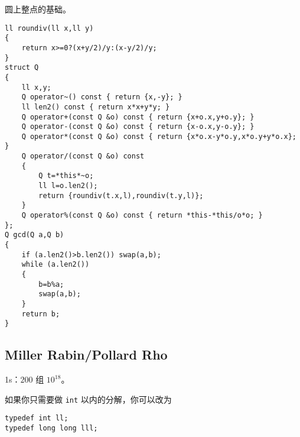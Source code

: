 \documentclass[12pt]{ctexart}
\begin{document}
圆上整点的基础。

\begin{lstlisting}
ll roundiv(ll x,ll y)
{
	return x>=0?(x+y/2)/y:(x-y/2)/y;
}
struct Q
{
	ll x,y;
	Q operator~() const { return {x,-y}; }
	ll len2() const { return x*x+y*y; }
	Q operator+(const Q &o) const { return {x+o.x,y+o.y}; }
	Q operator-(const Q &o) const { return {x-o.x,y-o.y}; }
	Q operator*(const Q &o) const { return {x*o.x-y*o.y,x*o.y+y*o.x}; }
	Q operator/(const Q &o) const
	{
		Q t=*this*~o;
		ll l=o.len2();
		return {roundiv(t.x,l),roundiv(t.y,l)};
	}
	Q operator%(const Q &o) const { return *this-*this/o*o; }
};
Q gcd(Q a,Q b)
{
	if (a.len2()>b.len2()) swap(a,b);
	while (a.len2())
	{
		b=b%a;
		swap(a,b);
	}
	return b;
}

\end{lstlisting}

\subsection{Miller Rabin/Pollard Rho}

1s：$200$ 组 $10^{18}$。

如果你只需要做 \verb|int| 以内的分解，你可以改为

\begin{lstlisting}
typedef int ll;
typedef long long lll;
\end{lstlisting}
\end{document}

